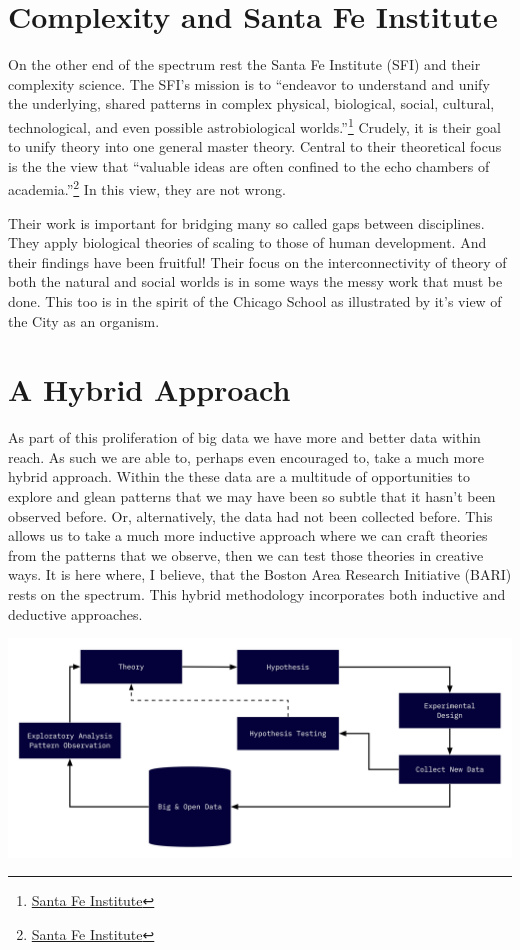 \documentclass[
]{book}
\begin{document}
\hypertarget{complexity-and-santa-fe-institute}{%
\section{Complexity and Santa Fe Institute}\label{complexity-and-santa-fe-institute}}

On the other end of the spectrum rest the Santa Fe Institute (SFI) and their complexity science. The SFI's mission is to ``endeavor to understand and unify the underlying, shared patterns in complex physical, biological, social, cultural, technological, and even possible astrobiological worlds.''\footnote{\href{https://www.santafe.edu/about}{Santa Fe Institute}} Crudely, it is their goal to unify theory into one general master theory. Central to their theoretical focus is the the view that ``valuable ideas are often confined to the echo chambers of academia.''\footnote{\href{https://www.santafe.edu/about}{Santa Fe Institute}} In this view, they are not wrong.

Their work is important for bridging many so called gaps between disciplines. They apply biological theories of scaling to those of human development. And their findings have been fruitful! Their focus on the interconnectivity of theory of both the natural and social worlds is in some ways the messy work that must be done. This too is in the spirit of the Chicago School as illustrated by it's view of the City as an organism.

\hypertarget{a-hybrid-approach}{%
\section{A Hybrid Approach}\label{a-hybrid-approach}}

As part of this proliferation of big data we have more and better data within reach. As such we are able to, perhaps even encouraged to, take a much more hybrid approach. Within the these data are a multitude of opportunities to explore and glean patterns that we may have been so subtle that it hasn't been observed before. Or, alternatively, the data had not been collected before. This allows us to take a much more inductive approach where we can craft theories from the patterns that we observe, then we can test those theories in creative ways. It is here where, I believe, that the Boston Area Research Initiative (BARI) rests on the spectrum. This hybrid methodology incorporates both inductive and deductive approaches.

\includegraphics{static/hybrid-approach.png}
\end{document}
